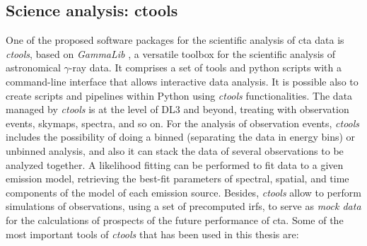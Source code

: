\documentclass[main.tex]{subfiles}
\begin{document}
\subsection{Science analysis: ctools} \label{sec:ctools}

One of the proposed software packages for the scientific analysis of \gls{cta} data is \textit{ctools}, based on \textit{GammaLib} \cite{2016ctools}, a versatile toolbox for the scientific analysis of astronomical $\gamma$-ray data. It comprises a set of tools and python scripts with a command-line interface that allows interactive data analysis. It is possible also to create scripts and pipelines within Python using \textit{ctools} functionalities. The data managed by \textit{ctools} is at the level of DL3 and beyond, treating with observation events, skymaps, spectra, and so on. For the analysis of observation events, \textit{ctools} includes the possibility of doing a binned (separating the data in energy bins) or unbinned analysis, and also it can stack the data of several observations to be analyzed together. A likelihood fitting can be performed to fit data to a given emission model, retrieving the best-fit parameters of spectral, spatial, and time components of the model of each emission source. Besides, \textit{ctools} allow to perform simulations of observations, using a set of precomputed \glspl{irf}, to serve as \textit{mock data} for the calculations of prospects of the future performance of \gls{cta}. Some of the most important tools of \textit{ctools} that has been used in this thesis are: \\
\end{document}
